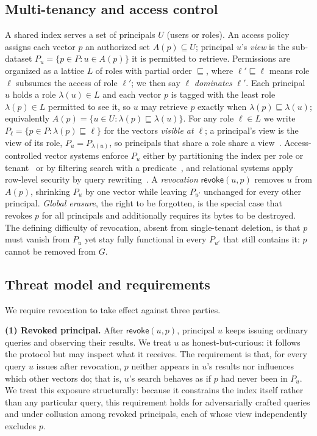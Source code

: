 \documentclass[sigconf, nonacm, review]{acmart}
\newcommand{\rev}{\mathsf{revoke}}
\begin{document}
\subsection{Multi-tenancy and access control}
A shared index serves a set of principals $U$ (users or roles). An access
policy assigns each vector $p$ an authorized set $A(p)\subseteq U$;
principal $u$'s \emph{view} is the sub-dataset $P_u=\{p\in P: u\in A(p)\}$
it is permitted to retrieve. Permissions are organized as a lattice $L$ of roles with partial order
$\sqsubseteq$, where $\ell'\sqsubseteq\ell$ means role $\ell$ subsumes the
access of role $\ell'$; we then say $\ell$ \emph{dominates} $\ell'$. Each
principal $u$ holds a role $\lambda(u)\in L$ and each vector $p$ is tagged
with the least role $\lambda(p)\in L$ permitted to see it, so $u$ may
retrieve $p$ exactly when $\lambda(p)\sqsubseteq\lambda(u)$; equivalently
$A(p)=\{u\in U:\lambda(p)\sqsubseteq\lambda(u)\}$. For any role $\ell\in L$
we write $P_\ell=\{p\in P:\lambda(p)\sqsubseteq\ell\}$ for the vectors
\emph{visible at} $\ell$; a principal's view is the view of its role,
$P_u=P_{\lambda(u)}$, so principals that share a role share a
view~\cite{DBLP:journals/corr/abs-2505-01538,DBLP:journals/corr/abs-2401-07119}.
Access-controlled vector systems enforce $P_u$ either by partitioning the
index per role or tenant~\cite{DBLP:journals/corr/abs-2505-01538,DBLP:journals/corr/abs-2401-07119}
or by filtering search with a
predicate~\cite{DBLP:journals/pacmmod/PatelKGZ24,DBLP:conf/www/GollapudiKSKBRL23,DBLP:journals/pacmmod/CaiSCZ24},
and relational systems apply row-level security by query
rewriting~\cite{DBLP:conf/sigmod/RizviMSR04}. A \emph{revocation}
$\rev(u,p)$ removes $u$ from $A(p)$, shrinking $P_u$ by one vector while
leaving $P_{u'}$ unchanged for every other principal. \emph{Global erasure},
the right to be forgotten, is the special case that revokes $p$ for all
principals and additionally requires its bytes to be destroyed. The
defining difficulty of revocation, absent from single-tenant deletion, is
that $p$ must vanish from $P_u$ yet stay fully functional in every $P_{u'}$
that still contains it: $p$ cannot be removed from $G$.

\subsection{Threat model and requirements}
We require revocation to take effect against three parties.

\noindent\textbf{(1) Revoked principal.} After $\rev(u,p)$, principal $u$
keeps issuing ordinary queries and observing their results. We treat $u$ as
honest-but-curious: it follows the protocol but may inspect what it
receives. The requirement is that, for every query $u$ issues after
revocation, $p$ neither appears in $u$'s results nor influences which other
vectors do; that is, $u$'s search behaves as if $p$ had never been in
$P_u$. We treat this exposure structurally: because it constrains the index itself rather
than any particular query, this requirement holds for adversarially crafted
queries and under collusion among revoked principals, each of whose view
independently excludes $p$.
\end{document}
